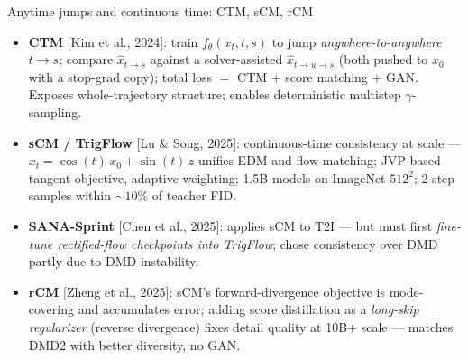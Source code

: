 \documentclass[aspectratio=169,10pt]{beamer}
\newcommand{\litref}[1]{{\scriptsize\color{black!55}[#1]}}
\begin{document}
\begin{frame}{Anytime jumps and continuous time: CTM, sCM, rCM}
  \begin{itemize}
    \item \textbf{CTM} \litref{Kim et al., 2024}: train $f_\theta(x_t, t, s)$
      to jump \emph{anywhere-to-anywhere} $t \to s$; compare
      $\hat{x}_{t\to s}$ against a solver-assisted
      $\hat{x}_{t \to u \to s}$ (both pushed to $x_0$ with a stop-grad copy);
      total loss $=$ CTM $+$ score matching $+$ GAN. Exposes whole-trajectory
      structure; enables deterministic multistep $\gamma$-sampling.
    \item \textbf{sCM / TrigFlow} \litref{Lu \& Song, 2025}: continuous-time
      consistency at scale ---
      $x_t = \cos(t)\,x_0 + \sin(t)\,z$ unifies EDM and flow matching;
      JVP-based tangent objective, adaptive weighting; 1.5B models on
      ImageNet $512^2$; 2-step samples within ${\sim}10\%$ of teacher FID.
    \item \textbf{SANA-Sprint} \litref{Chen et al., 2025}: applies sCM to T2I
      --- but must first \emph{fine-tune rectified-flow checkpoints into
      TrigFlow}; chose consistency over DMD partly due to DMD instability.
    \item \textbf{rCM} \litref{Zheng et al., 2025}: sCM's forward-divergence
      objective is mode-covering and accumulates error; adding score
      distillation as a \emph{long-skip regularizer} (reverse divergence)
      fixes detail quality at 10B$+$ scale --- matches DMD2 with better
      diversity, no GAN.
  \end{itemize}
\end{frame}
\end{document}
